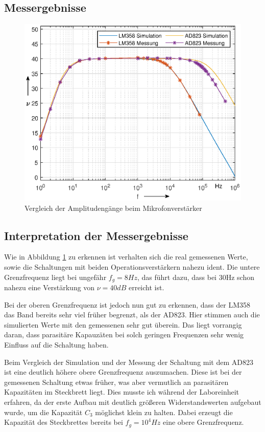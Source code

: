 \subsection{Messergebnisse}
\begin{figure}[H]
    \centering
    \includegraphics[width=\textwidth]{Lab_3/Plots/Mikrofonverstaerker.eps}
    \caption{Vergleich der Amplitudengänge beim Mikrofonverstärker}
    \label{fig:Amplitudengang_Mikverstaerker}
\end{figure}
\subsection{Interpretation der Messergebnisse} 
Wie in Abbildung \ref{fig:Amplitudengang_Mikverstaerker} zu erkennen ist verhalten sich die real gemessenen Werte, sowie die Schaltungen mit beiden Operationsverstärkern nahezu ident. Die untere Grenzfrequenz liegt bei ungefähr $f_g=8Hz$, das führt dazu, dass bei 30Hz schon nahezu eine Verstärkung von $\nu = 40dB$ erreicht ist.

Bei der oberen Grenzfrequenz ist jedoch nun gut zu erkennen, dass der LM358 das Band bereits sehr viel früher begrenzt, als der AD823. Hier stimmen auch die simulierten Werte mit den gemessenen sehr gut überein. Das liegt vorrangig daran, dass parasitäre Kapauzäten bei solch geringen Frequenzen sehr wenig Einfluss auf die Schaltung haben.

Beim Vergleich der Simulation und der Messung der Schaltung mit dem AD823 ist eine deutlich höhere obere Grenzfrequenz auszumachen. Diese ist bei der gemessenen Schaltung etwas früher, was aber vermutlich an parasitären Kapazitäten im Steckbrett liegt. Dies musste ich während der Laboreinheit erfahren, da der erste Aufbau mit deutlich größeren Widerstandswerten aufgebaut wurde, um die Kapazität $C_3$ möglichst klein zu halten. Dabei erzeugt die Kapazität des Steckbrettes bereits bei $f_g=10^4Hz$ eine obere Grenzfrequenz. 

